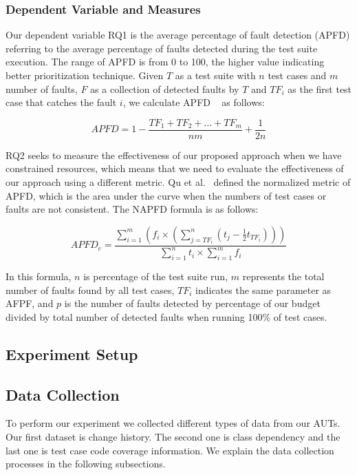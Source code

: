 \subsubsection{Dependent Variable and Measures}
\label{sec:dependent}

Our dependent variable RQ1 is the average percentage of fault detection (APFD)
referring to the average percentage of faults detected during the test suite execution. 
The range of APFD is from 0 to 100, the higher value indicating better prioritization technique. 
Given $T$ as a test suite with $n$ test cases and $m$ number of faults, 
$F$ as a collection of detected faults by $T$ and
$TF_{i}$ as the first test case that catches the fault $i$, 
we calculate APFD ~\cite{apfd} as follows:

\[
{APFD = 1- \frac {{TF_{1} + TF_{2} + ... + TF_{m}}} {nm} + \frac{1}{2n}}
\]

RQ2 seeks to measure the effectiveness of our proposed approach
when we have constrained resources, which means that we need to evaluate 
the effectiveness of our approach using a different metric. 
Qu et al.~\cite{myra} defined the normalized metric of APFD, which is the
area under the curve when the numbers of test cases or faults are not consistent. 
The NAPFD formula is as follows:

\[
{APFD_{c} = \frac { \sum_{i=1}^{m} (f_{i} \times (\sum_{j=TF_{i}}^{n} (t_{j} - \frac{1}{2} t_{TF_{i}})) )} 
	{\sum_{i=1}^{n}{t_{i}} \times \sum_{i=1}^{m}{f_{i}}}}
\]

In this formula, $n$ is percentage of the test suite run, 
$m$ represents the total number of faults found by all test cases,
$TF_{i}$ indicates the same parameter as AFPF, and 
$p$ is the number of faults detected by percentage of our
budget divided by total number of detected faults when 
running 100\% of test cases.  


\subsection{Experiment Setup}
\label{sec:setup}

\subsection{Data Collection}
To perform our experiment we collected different types of data from our AUTs.
Our first dataset is change history. 
The second one is class dependency and the last one is 
test case code coverage information.
We explain the data collection processes
in the following subsections.

